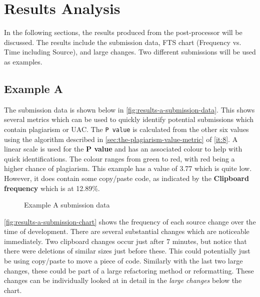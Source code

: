 \chapter{Results Analysis}
\label{chp:results}
In the following sections, the results produced from the post-processor will be discussed. The results include the submission data, FTS chart (Frequency vs. Time including Source), and large changes. Two different submissions will be used as examples.

\section{Example A}
The submission data is shown below in \autoref{fig:results-a-submission-data}. This shows several metrics which can be used to quickly identify potential submissions which contain plagiarism or UAC. The \texttt{P value} is calculated from the other six values using the algorithm described in \autoref{sec:the-plagiarism-value-metric} of \autoref{it:8}. A linear scale is used for the \textbf{P value} and has an associated colour to help with quick identifications. The colour ranges from green to red, with red being a higher chance of plagiarism. This example has a value of 3.77 which is quite low. However, it does contain some copy/paste code, as indicated by the \textbf{Clipboard frequency} which is at 12.89\%.

\begin{figure}[H]
  \centering
  \caption[Submission Results A Data]{Example A submission data}
  \label{fig:results-a-submission-data}
\end{figure}

\newpage

\autoref{fig:results-a-submission-chart} shows the frequency of each source change over the time of development. There are several substantial changes which are noticeable immediately. Two clipboard changes occur just after 7 minutes, but notice that there were deletions of similar sizes just before these. This could potentially just be using copy/paste to move a piece of code. Similarly with the last two large changes, these could be part of a large refactoring method or reformatting. These changes can be individually looked at in detail in the \textit{large changes} below the chart.

